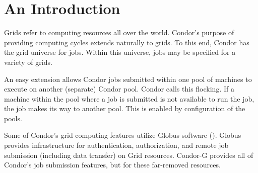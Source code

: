 \section{\label{sec:grids-intro}An Introduction}

Grids refer to computing resources all over the world. 
Condor's purpose of providing computing cycles extends naturally
to grids.
To this end, Condor has the grid universe for jobs.
Within this universe, jobs may be specified for a variety
of grids.

An easy extension allows Condor jobs submitted within one pool
of machines to execute on another (separate) Condor pool.
Condor calls this flocking.
If a machine within the pool where a job is submitted is not
available to run the job,
the job makes its way to another pool.
This is enabled by configuration of the pools.

Some of Condor's grid computing features utilize Globus software
().
Globus provides infrastructure for authentication, authorization,
and remote job submission (including data transfer) on Grid resources.
Condor-G provides all of Condor's job submission features,
but for these far-removed resources.
